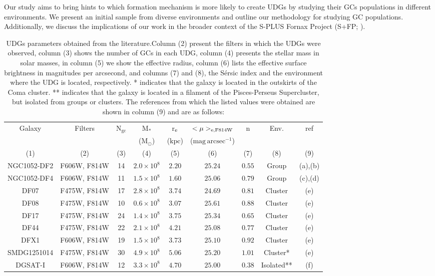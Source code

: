 \documentclass[baaa]{baaa}
\begin{document}
Our study aims to bring hints to which formation mechanism is more likely to create UDGs by studying their GCs populations in different environments. We present an initial sample from diverse environments and outline our methodology for studying GC populations. Additionally, we discuss the implications of our work in the broader context of the S-PLUS Fornax Project (S+FP; \citealp{SC2024}).



\begin{table*}[]
    \centering
    \begin{tabular}{ccccccccc}
        \hline \hline
         Galaxy & Filters & \textrm{N}$_{\mathrm{gc}}$&M$_{*}$       & r$_{\rm e}$&  $<\mu>_{\rm e,F814W}$    &n &Env. &ref \\
                &         &         & ($\mathrm{M}_{\odot}$)  & ($\mathrm{kpc}$)  & ($\mathrm{mag\, arcsec}^{-1}$)   & & &  \\
            (1)    &  (2)       &    (3)     &        (4)        &   (5)     &           (6)            & (7)  &   (8)   &  (9) \\
         \hline
         NGC1052-DF2& F606W, F814W& 14 &$2.0\times 10^{8} $  &$2.20 $ &$25.24 $ & $0.55$& Group & (a),(b) \\
         NGC1052-DF4& F606W, F814W& 11 &$1.5\times 10^{8} $  &$1.60 $ &$25.06 $ & $0.79$& Group & (c),(d) \\
         DF07       &F475W, F814W & 17 &$2.8\times 10^{8} $  &$3.74 $ &$24.69 $ & $0.81$&Cluster & (e) \\
         DF08       &F475W, F814W & 10 &$0.6\times 10^{8} $  &$3.07 $ &$25.61 $ & $0.88$&Cluster & (e) \\
         DF17       &F475W, F814W & 24 &$1.4\times 10^{8} $  &$3.75 $ &$25.34 $ & $0.65$&Cluster & (e) \\
         DF44       &F475W, F814W & 22 &$2.1\times 10^{8} $  &$4.21 $ &$25.08 $ & $0.77$&Cluster & (e) \\
         DFX1       &F606W, F814W & 19 &$1.5\times 10^{8} $  &$3.73 $ &$25.10 $ & $0.92$&Cluster & (e) \\
         SMDG1251014& F475W, F814W& 30 &$4.9\times 10^{8} $  &$5.06 $ &$25.20 $ & $1.01$&Cluster*& (e) \\
         DGSAT-I    & F606W, F814W& 12 &$3.3\times 10^{8} $  &$4.70 $ &$25.00 $ & $0.38$&Isolated** & (f) \\
         \hline
    \end{tabular} 
    \caption{UDGs parameters obtained from the literature.Column (2) present the filters in which the UDGs were observed, column (3) shows the number of GCs in each UDG, column (4) presents the stellar mass in solar masses, in column (5) we show the effective radius, column (6) lists the effective surface brightness in magnitudes per arcsecond, and columns (7) and (8), the Sérsic index and the environment where the UDG is located, respectively. * indicates that the galaxy is located in the outskirts of the Coma cluster. ** indicates that the galaxy is located in a filament of the Pisces-Perseus Supercluster, but isolated from groups or clusters. The references from which the listed values were obtained are shown in column (9) and are as follows: 
}
\end{table*}
\end{document}
